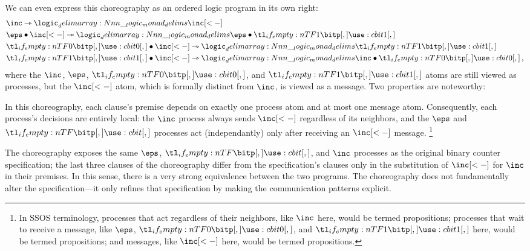 %
We can even express this choreography as an ordered logic program in its own right:
\begin{align*}
  &\inc \lrimp \monad{\inc[<-]} \\
  &\eps \fuse \inc[<-] \lrimp \monad{\eps \fuse \bit{1}} \\
  &\bit{0} \fuse \inc[<-] \lrimp \monad{\bit{1}} \\
  &\bit{1} \fuse \inc[<-] \lrimp \monad{\inc \fuse \bit{0}} \text{\,,}
\end{align*}
where the $\inc$, $\eps$, $\bit{0}$, and $\bit{1}$ atoms are still viewed as processes, but the $\inc[<-]$ atom, which is formally distinct from $\inc$, is viewed as a message.
%
Two properties are noteworthy:
\begin{description}[font=\normalfont\itshape, leftmargin=\parindent, labelindent=\leftmargin]
\item[Locality.]
In this choreography, each clause's premise depends on exactly one process atom and at most one message atom.
Consequently, each process's decisions are entirely local: the $\inc$ process always sends $\inc[<-]$ regardless of its neighbors, and the $\eps$ and $\bit{}$ processes act (independantly) only after receiving an $\inc[<-]$ message.%
\footnote{In \ac{SSOS} terminology, processes that act regardless of their neighbors, like $\inc$ here, would be termed  propositions; processes that wait to receive a message, like $\eps$, $\bit{0}$, and $\bit{1}$ here, would be termed  propositions; and messages, like $\inc[<-]$ here, would be termed  propositions.}
%
\item[Specification-preserving.]
The choreography exposes the same $\eps$, $\bit{}$, and $\inc$ processes as the original binary counter specification; the last three clauses of the choreography differ from the specification's clauses only in the substitution of $\inc[<-]$ for $\inc$ in their premises.
In this sense, there is a very strong equivalence between the two programs.
The choreography does not fundamentally alter the specification---it only refines that specification by making the communication patterns explicit.


\end{description}
